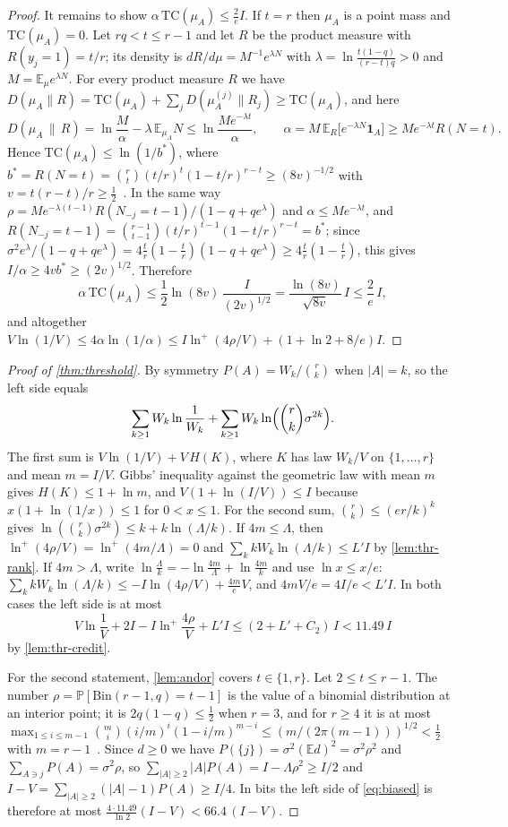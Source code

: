 \documentclass[11pt]{amsart}
\theoremstyle{definition}
\theoremstyle{remark}
\newcommand{\E}{\mathbb{E}}
\renewcommand{\Pr}{\mathbb{P}}
\newcommand{\Bin}{\mathrm{Bin}}
\begin{document}
\begin{proof}
It remains to show $\alpha\,\mathrm{TC}(\mu_A)\le\frac2eI$. If $t=r$ then $\mu_A$ is a point mass and
$\mathrm{TC}(\mu_A)=0$. Let $rq<t\le r-1$ and let $R$ be the product measure with $R(y_j=1)=t/r$; its density is
$dR/d\mu=M^{-1}e^{\lambda N}$ with $\lambda=\ln\frac{t(1-q)}{(r-t)q}>0$ and $M=\E_\mu e^{\lambda N}$. For every
product measure $R$ we have $D(\mu_A\|R)=\mathrm{TC}(\mu_A)+\sum_jD(\mu_A^{(j)}\|R_j)\ge\mathrm{TC}(\mu_A)$, and here
\[
D(\mu_A\,\|\,R)=\ln\frac M\alpha-\lambda\,\E_{\mu_A}N\le\ln\frac{Me^{-\lambda t}}\alpha,\qquad
\alpha=M\,\E_R\bigl[e^{-\lambda N}\mathbf 1_A\bigr]\ge Me^{-\lambda t}R(N=t).
\]
Hence $\mathrm{TC}(\mu_A)\le\ln(1/b^\ast)$, where $b^\ast=R(N=t)=\binom rt(t/r)^t(1-t/r)^{r-t}\ge(8v)^{-1/2}$ with
$v=t(r-t)/r\ge\frac12$~\cite[Ch.~10, Lemma~7]{MS77}. In the same way
$\rho=Me^{-\lambda(t-1)}R(N_{-j}=t-1)/(1-q+qe^\lambda)$ and $\alpha\le Me^{-\lambda t}$, and
$R(N_{-j}=t-1)=\binom{r-1}{t-1}(t/r)^{t-1}(1-t/r)^{r-t}=b^\ast$; since
$\sigma^2e^\lambda/(1-q+qe^\lambda)=4\frac tr(1-\frac tr)(1-q+qe^\lambda)\ge4\frac tr(1-\frac tr)$, this gives
$I/\alpha\ge4vb^\ast\ge(2v)^{1/2}$. Therefore
\[
\alpha\,\mathrm{TC}(\mu_A)\le\frac12\ln(8v)\,\frac I{(2v)^{1/2}}=\frac{\ln(8v)}{\sqrt{8v}}\,I\le\frac2e\,I,
\]
and altogether $V\ln(1/V)\le4\alpha\ln(1/\alpha)\le I\ln^+(4\rho/V)+(1+\ln2+8/e)I$.
\end{proof}

\begin{proof}[Proof of \cref{thm:threshold}]
By symmetry $P(A)=W_k/\binom rk$ when $|A|=k$, so the left side equals
\[
\sum_{k\ge1}W_k\ln\frac1{W_k}+\sum_{k\ge1}W_k\ln\Bigl(\binom rk\sigma^{2k}\Bigr).
\]
The first sum is $V\ln(1/V)+V\,H(K)$, where $K$ has law $W_k/V$ on $\{1,\dots,r\}$ and mean $m=I/V$. Gibbs'
inequality against the geometric law with mean $m$ gives $H(K)\le1+\ln m$, and $V(1+\ln(I/V))\le I$ because
$x(1+\ln(1/x))\le1$ for $0<x\le1$. For the second sum, $\binom rk\le(er/k)^k$ gives
$\ln(\binom rk\sigma^{2k})\le k+k\ln(\Lambda/k)$. If $4m\le\Lambda$, then $\ln^+(4\rho/V)=\ln^+(4m/\Lambda)=0$ and
$\sum_kkW_k\ln(\Lambda/k)\le L'I$ by \cref{lem:thr-rank}. If $4m>\Lambda$, write
$\ln\frac\Lambda k=-\ln\frac{4m}\Lambda+\ln\frac{4m}k$ and use $\ln x\le x/e$:
$\sum_kkW_k\ln(\Lambda/k)\le-I\ln(4\rho/V)+\frac{4m}e V$, and $4mV/e=4I/e<L'I$. In both cases the left side is at most
\[
V\ln\frac1V+2I-I\ln^+\frac{4\rho}V+L'I\le(2+L'+C_2)\,I<11.49\,I
\]
by \cref{lem:thr-credit}.

For the second statement, \cref{lem:andor} covers $t\in\{1,r\}$. Let $2\le t\le r-1$. The number
$\rho=\Pr[\Bin(r-1,q)=t-1]$ is the value of a binomial distribution at an interior point; it is $2q(1-q)\le\frac12$
when $r=3$, and for $r\ge4$ it is at most $\max_{1\le i\le m-1}\binom mi(i/m)^i(1-i/m)^{m-i}\le(m/(2\pi(m-1)))^{1/2}
<\frac12$ with $m=r-1$~\cite{MS77}. Since $d\ge0$ we have $P(\{j\})=\sigma^2(\E d)^2=\sigma^2\rho^2$ and
$\sum_{A\ni j}P(A)=\sigma^2\rho$, so $\sum_{|A|\ge2}|A|P(A)=I-\Lambda\rho^2\ge I/2$ and
$I-V=\sum_{|A|\ge2}(|A|-1)P(A)\ge I/4$. In bits the left side of \eqref{eq:biased} is therefore at most
$\frac{4\cdot11.49}{\ln2}(I-V)<66.4\,(I-V)$.
\end{proof}
\end{document}
